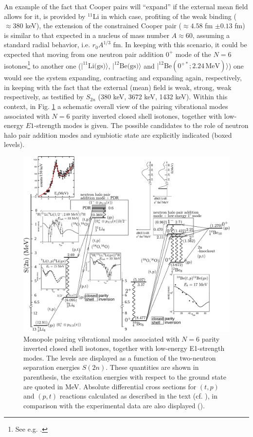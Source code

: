 An example of the fact that Cooper pairs will ``expand'' if the external mean field allows for it, is provided by $^{11}$Li 
 in which case, profiting of the weak binding ($\approx 380$ keV), the extension of the constrained Cooper  pair ($\approx 4.58 $ fm $\pm 0.13$ fm)   is similar to that expected in a nucleus of mass number $A\approx 60$, assuming a standard radial behavior, i.e. $r_0 A^{1/3}$ fm. In keeping with this scenario, it could be expected that moving from one neutron pair addition $0^+$ mode of the $N=6$ isotones\footnote{See e.g. \cite{Gori:04}.} to another one ($|^{11}\text{Li(gs)}\rangle$, $|^{12}\text{Be(gs)}\rangle$ and $|^{12}\text{Be}(0^{+*};2.24\,\text{MeV})\rangle$) one would see the system expanding, contracting and expanding again, respectively, in keeping with the fact that the external (mean) field is weak, strong, weak respectively, as testified by $S_{2n}$ (380 keV, 3672 keV, 1432 keV).  
Within this context, in Fig. \ref{fig3.8.1} a schematic overall view of the pairing vibrational modes associated with $N=6$ parity inverted closed shell isotones, together with low-energy $E1$-strength modes is given. The possible candidates to the role of neutron halo pair addition modes and symbiotic state are explicitly indicated (boxed levels). 
\begin{figure}
	\centerline{\includegraphics*[width=20cm,angle=90]{nutshell/figs/fig3_8_1_v3}}
	\caption{Monopole pairing vibrational modes associated with 
		$N=6$ parity inverted closed shell isotones, together with low-energy E1-strength modes. 
		The levels are  displayed as a function of the two-neutron separation energies $S(2n)$. 
		These quantities are shown in parenthesis, the excitation energies with respect to the ground state are quoted in MeV. 
		Absolute differential cross sections for  $(t,p)$ and $(p,t)$ reactions calculated as described in the text (cf. \cite{Potel:10,Potel:14}), 
		in comparison with the experimental data are also displayed (\cite{Young:71,Fortune:94}).}\label{fig3.8.1}
\end{figure}

